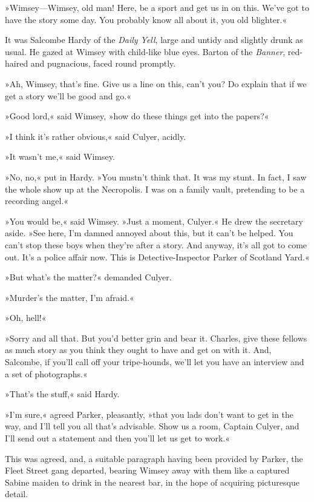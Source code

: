 »Wimsey—Wimsey, old man! Here, be a sport and get us in on this. We've got to have the story some day. You probably know all about it, you old blighter.«

It was Salcombe Hardy of the \textit{Daily Yell}, large and untidy and slightly drunk as usual. He gazed at Wimsey with child-like blue eyes. Barton of the \textit{Banner}, red-haired and pugnacious, faced round promptly.

»Ah, Wimsey, that's fine. Give us a line on this, can't you? Do explain that if we get a story we'll be good and go.«

»Good lord,« said Wimsey, »how do these things get into the papers?«

»I think it's rather obvious,« said Culyer, acidly.

»It wasn't me,« said Wimsey.

»No, no,« put in Hardy. »You mustn't think that. It was my stunt. In fact, I saw the whole show up at the Necropolis. I was on a family vault, pretending to be a recording angel.«

»You would be,« said Wimsey. »Just a moment, Culyer.« He drew the secretary aside. »See here, I'm damned annoyed about this, but it can't be helped. You can't stop these boys when they're after a story. And anyway, it's all got to come out. It's a police affair now. This is Detective-Inspector Parker of Scotland Yard.«

»But what's the matter?« demanded Culyer.

»Murder's the matter, I'm afraid.«

»Oh, hell!«

»Sorry and all that. But you'd better grin and bear it. Charles, give these fellows as much story as you think they ought to have and get on with it. And, Salcombe, if you'll call off your tripe-hounds, we'll let you have an interview and a set of photographs.«

»That's the stuff,« said Hardy.

»I'm sure,« agreed Parker, pleasantly, »that you lads don't want to get in the way, and I'll tell you all that's advisable. Show us a room, Captain Culyer, and I'll send out a statement and then you'll let us get to work.«

This was agreed, and, a suitable paragraph having been provided by Parker, the Fleet Street gang departed, bearing Wimsey away with them like a captured Sabine maiden to drink in the nearest bar, in the hope of acquiring picturesque detail.

